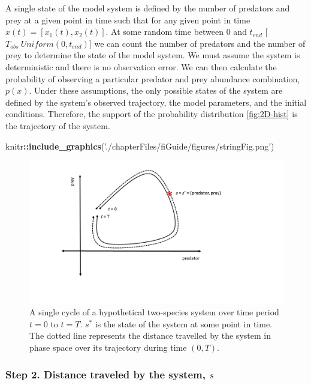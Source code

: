 \documentclass[12pt,twoside,openany]{reedthesis}
\newenvironment{Shaded}{\begin{snugshade}}{\end{snugshade}}
\newcommand{\KeywordTok}[1]{\textcolor[rgb]{0.13,0.29,0.53}{\textbf{#1}}}
\newcommand{\NormalTok}[1]{#1}
\newcommand{\OperatorTok}[1]{\textcolor[rgb]{0.81,0.36,0.00}{\textbf{#1}}}
\newcommand{\StringTok}[1]{\textcolor[rgb]{0.31,0.60,0.02}{#1}}
\begin{document}
A single state of the model system is defined by the number of predators and prey at a given point in time such that for any given point in time \(x(t)=[x_1 (t),x_2 (t)]\). At some random time between 0 and \(t_{end}\) {[}\(T_{obs} ~ Uniform(0,t_{end})\){]} we can count the number of predators and the number of prey to determine the state of the model system. We must assume the system is deterministic and there is no observation error. We can then calculate the probability of observing a particular predator and prey abundance combination, \(p(x)\). Under these assumptions, the only possible states of the system are defined by the system's observed trajectory, the model parameters, and the initial conditions. Therefore, the support of the probability distribution \ref{fig:2D-hist} is the trajectory of the system.
\begin{Shaded}
\begin{Highlighting}[]
\NormalTok{knitr}\OperatorTok{::}\KeywordTok{include_graphics}\NormalTok{(}\StringTok{'./chapterFiles/fiGuide/figures/stringFig.png'}\NormalTok{)}
\end{Highlighting}
\end{Shaded}
\begin{figure}
\includegraphics[width=17.78in]{./chapterFiles/fiGuide/figures/stringFig} \caption{A single cycle of a hypothetical two-species system over time period $t = 0$ to $t = T$. $s^*$ is the state of the system at some point in time. The dotted line represents the distance travelled by the system in phase space over its trajectory during time $(0, T)$.}\label{fig:stringFig}
\end{figure}
\hypertarget{step-2.-distance-traveled-by-the-system-s}{%
\subsubsection{\texorpdfstring{\textbf{Step 2.} Distance traveled by the system, \(s\)}{Step 2. Distance traveled by the system, s}}\label{step-2.-distance-traveled-by-the-system-s}}
\end{document}
